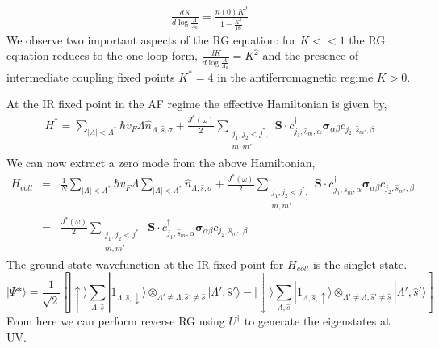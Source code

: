 \documentclass[aps,prl,preprint,groupedaddress]{revtex4-2}
\begin{document}
\begin{eqnarray}
\frac{d K}{d\log\frac{\Lambda}{\Lambda_{0}}}=\frac{n(0)K^{2}}{1-\frac{K^{2}}{16}}
\end{eqnarray}
We observe two important aspects of the RG equation: for $K<<1$ the RG equation reduces to the one loop form, $\frac{d K}{d\log\frac{\Lambda}{\Lambda_{0}}}=K^{2}$ and the presence of intermediate coupling fixed points $K^{*}=4$ in the antiferromagnetic regime $K>0$.
\par\noindent
At the IR fixed point in the AF regime the effective Hamiltonian is given by,
\begin{eqnarray}
H^{*}=\sum_{|\Lambda|<\Lambda^{*}}\hbar v_{F}\Lambda\hat{n}_{\Lambda,\hat{s},\sigma}+\frac{J^{*}(\omega)}{2}\sum_{\substack{j_{1},j_{2}<j^{*},\\ m,m'}}\mathbf{S}\cdot c^{\dagger}_{j_{1},\hat{s}_{m},\alpha}\boldsymbol{\sigma}_{\alpha\beta}c_{j_{2},\hat{s}_{m'},\beta}
\end{eqnarray} 
We can now extract a zero mode from the above Hamiltonian,
\begin{eqnarray}
H_{coll}&=&\frac{1}{N}\sum_{|\Lambda|<\Lambda^{*}}\hbar v_{F}\Lambda\sum_{|\Lambda|<\Lambda^{*}}\hat{n}_{\Lambda,\hat{s},\sigma}+\frac{J^{*}(\omega)}{2}\sum_{\substack{j_{1},j_{2}<j^{*},\\ m,m'}}\mathbf{S}\cdot c^{\dagger}_{j_{1},\hat{s}_{m},\alpha}\boldsymbol{\sigma}_{\alpha\beta}c_{j_{2},\hat{s}_{m'},\beta}\nonumber\\
		&=&\frac{J^{*}(\omega)}{2}\sum_{\substack{j_{1},j_{2}<j^{*},\\ m,m'}}\mathbf{S}\cdot c^{\dagger}_{j_{1},\hat{s}_{m},\alpha}\boldsymbol{\sigma}_{\alpha\beta}c_{j_{2},\hat{s}_{m'},\beta}
\end{eqnarray}
The ground state wavefunction at the IR fixed point for $H_{coll}$ is the singlet state.
\begin{equation}
|\Psi*\rangle=\frac{1}{\sqrt{2}}\left[|\uparrow\rangle\sum_{\Lambda,\hat{s}}|1_{\Lambda,\hat{s},\downarrow}\rangle\otimes_{\Lambda'\neq\Lambda,\hat{s}'\neq \hat{s}}|\Lambda',\hat{s}'\rangle-|\downarrow\rangle\sum_{\Lambda,\hat{s}}|1_{\Lambda,\hat{s},\uparrow}\rangle\otimes_{\Lambda'\neq\Lambda,\hat{s}'\neq \hat{s}}|\Lambda',\hat{s}'\rangle\right]
\end{equation}
From here we can perform reverse RG using $U^{\dagger}$ to generate the eigenstates at UV.
%



\end{document}
